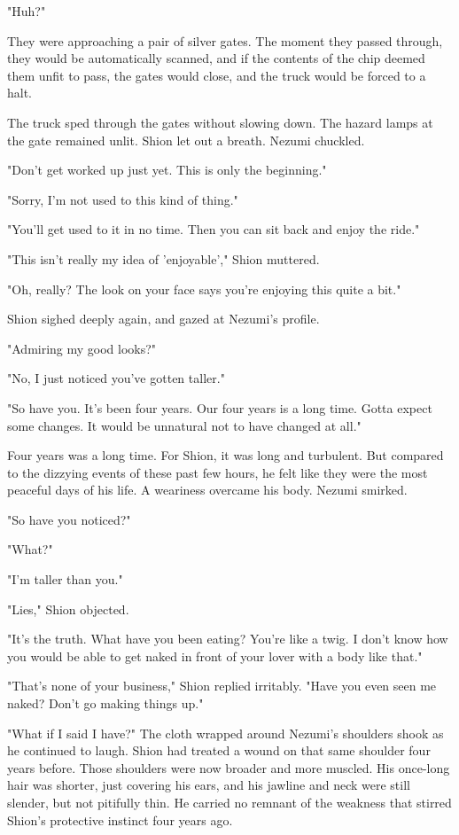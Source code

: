 "Huh?"

They were approaching a pair of silver gates. The moment they passed
through, they would be automatically scanned, and if the contents of the
chip deemed them unfit to pass, the gates would close, and the truck
would be forced to a halt.

The truck sped through the gates without slowing down. The hazard lamps
at the gate remained unlit. Shion let out a breath. Nezumi chuckled.

"Don't get worked up just yet. This is only the beginning."

"Sorry, I'm not used to this kind of thing."

"You'll get used to it in no time. Then you can sit back and enjoy the
ride."

"This isn't really my idea of 'enjoyable'," Shion muttered.

"Oh, really? The look on your face says you're enjoying this quite a
bit."

Shion sighed deeply again, and gazed at Nezumi's profile.

"Admiring my good looks?"

"No, I just noticed you've gotten taller."

"So have you. It's been four years. Our four years is a long time. Gotta
expect some changes. It would be unnatural not to have changed at all."

Four years was a long time. For Shion, it was long and turbulent. But
compared to the dizzying events of these past few hours, he felt like
they were the most peaceful days of his life. A weariness overcame his
body. Nezumi smirked.

"So have you noticed?"

"What?"

"I'm taller than you."

"Lies," Shion objected.

"It's the truth. What have you been eating? You're like a twig. I don't
know how you would be able to get naked in front of your lover with a
body like that."

"That's none of your business," Shion replied irritably. "Have you even
seen me naked? Don't go making things up."

"What if I said I have?" The cloth wrapped around Nezumi's shoulders
shook as he continued to laugh. Shion had treated a wound on that same
shoulder four years before. Those shoulders were now broader and more
muscled. His once-long hair was shorter, just covering his ears, and his
jawline and neck were still slender, but not pitifully thin. He carried
no remnant of the weakness that stirred Shion's protective instinct four
years ago.

